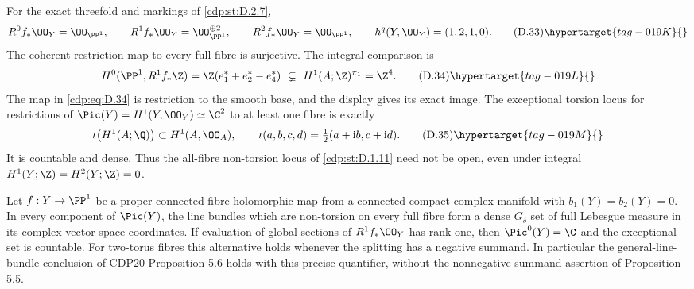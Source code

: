 
\begin{proposition}\hypertarget{tag-01GF}{}\label{cdp:st:D.2.8}



For the exact threefold and markings of \ref{cdp:st:D.2.7},
\[
 R^0f_*\OO_Y=\OO_{\PP^1},\qquad
 R^1f_*\OO_Y=\OO_{\PP^1}^{\oplus2},\qquad
 R^2f_*\OO_Y=\OO_{\PP^1},
 \qquad h^q(Y,\OO_Y)=(1,2,1,0).
\tag{D.33}\hypertarget{tag-019K}{}\label{cdp:eq:D.33}
\]
The coherent restriction map to every full fibre is surjective.
The integral comparison is
\[
 H^0(\PP^1,R^1f_*\Z)
   =\Z(e_1^*+e_2^*-e_4^*)
   \ \subsetneq\ H^1(A;\Z)^{\pi_1}=\Z^4.
\tag{D.34}\hypertarget{tag-019L}{}\label{cdp:eq:D.34}
\]
The map in \eqref{cdp:eq:D.34} is restriction to the smooth base, and the
display gives its exact image. The exceptional torsion locus
for restrictions of $\Pic(Y)=H^1(Y,\OO_Y)\simeq\C^2$ to
at least one fibre is exactly
\[
 \iota\bigl(H^1(A;\Q)\bigr)\subset H^1(A,\OO_A),
 \qquad
 \iota(a,b,c,d)=\tfrac12(a+\mathrm i b,c+\mathrm i d).
\tag{D.35}\hypertarget{tag-019M}{}\label{cdp:eq:D.35}
\]
It is countable and dense. Thus the all-fibre non-torsion locus
of \ref{cdp:st:D.1.11} need not be open, even under integral
$H^1(Y;\Z)=H^2(Y;\Z)=0$.
\end{proposition}

\begin{proposition}\hypertarget{tag-01FW}{}\label{cdp:st:D.1.11}


Let $f:Y\to\PP^1$ be a proper connected-fibre holomorphic map from
a connected compact complex manifold with $b_1(Y)=b_2(Y)=0$.
In every component of $\Pic(Y)$, the line
bundles which are non-torsion on every full fibre form a dense
$G_\delta$ set of full Lebesgue measure in its complex vector-space
coordinates. If evaluation of global sections of $R^1f_*\OO_Y$
has rank one, then $\Pic^0(Y)=\C$ and the exceptional set is
countable. For two-torus fibres this alternative holds whenever
the splitting has a negative summand.
In particular the general-line-bundle conclusion of CDP20
Proposition 5.6 holds with this precise quantifier, without the
nonnegative-summand assertion of Proposition 5.5.
\end{proposition}

